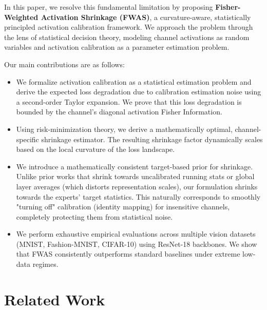 \documentclass{article}
\theoremstyle{plain}
\theoremstyle{definition}
\theoremstyle{remark}
\begin{document}
In this paper, we resolve this fundamental limitation by proposing \textbf{Fisher-Weighted Activation Shrinkage (FWAS)}, a curvature-aware, statistically principled activation calibration framework. We approach the problem through the lens of statistical decision theory, modeling channel activations as random variables and activation calibration as a parameter estimation problem. 

Our main contributions are as follows:
\begin{itemize}
    \item We formalize activation calibration as a statistical estimation problem and derive the expected loss degradation due to calibration estimation noise using a second-order Taylor expansion. We prove that this loss degradation is bounded by the channel's diagonal activation Fisher Information.
    \item Using risk-minimization theory, we derive a mathematically optimal, channel-specific shrinkage estimator. The resulting shrinkage factor dynamically scales based on the local curvature of the loss landscape.
    \item We introduce a mathematically consistent target-based prior for shrinkage. Unlike prior works that shrink towards uncalibrated running stats or global layer averages (which distorts representation scales), our formulation shrinks towards the experts' target statistics. This naturally corresponds to smoothly "turning off" calibration (identity mapping) for insensitive channels, completely protecting them from statistical noise.
    \item We perform exhaustive empirical evaluations across multiple vision datasets (MNIST, Fashion-MNIST, CIFAR-10) using ResNet-18 backbones. We show that FWAS consistently outperforms standard baselines under extreme low-data regimes.
\end{itemize}

\section{Related Work}
\label{sec:related}
\end{document}
